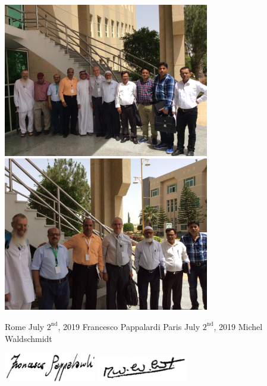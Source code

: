\documentclass[12pt,a4paper]{scrartcl}
\begin{document}
\centerline{\includegraphics[width=9cm]{4.jpg}
\includegraphics[width=9cm]{5.jpg}}\bigskip

Rome July $2^{\textrm{nd}}$, 2019 Francesco Pappalardi \hfill
Paris July $2^{\textrm{nd}}$, 2019 Michel Waldschmidt\\
\centerline{\includegraphics[width=4cm]{franfirm.jpg}\hfill
\includegraphics[width=4cm]{Signaturemiw012006.jpeg}}\bigskip
\end{document}
